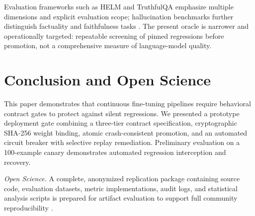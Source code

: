 \documentclass[conference]{IEEEtran}
\begin{document}
Evaluation frameworks such as HELM and TruthfulQA emphasize multiple dimensions and explicit evaluation scope; hallucination benchmarks further distinguish factuality and faithfulness tasks \cite{https://doi.org/10.1111/nyas.15007,lin-etal-2022-truthfulqa,bang-etal-2025-hallulens}. The present oracle is narrower and operationally targeted: repeatable screening of pinned regressions before promotion, not a comprehensive measure of language-model quality.

\section{Conclusion and Open Science}
{\small
This paper demonstrates that continuous fine-tuning pipelines require behavioral contract gates to protect against silent regressions. We presented a prototype deployment gate combining a three-tier contract specification, cryptographic SHA-256 weight binding, atomic crash-consistent promotion, and an automated circuit breaker with selective replay remediation. Preliminary evaluation on a 100-example canary demonstrates automated regression interception and recovery.

\textit{Open Science.} A complete, anonymized replication package containing source code, evaluation datasets, metric implementations, audit logs, and statistical analysis scripts is prepared for artifact evaluation to support full community reproducibility \cite{10.1145/3287560.3287596}.
}

\newpage
\renewcommand{\IEEEbibitemsep}{0pt plus 0.25pt}


\end{document}
